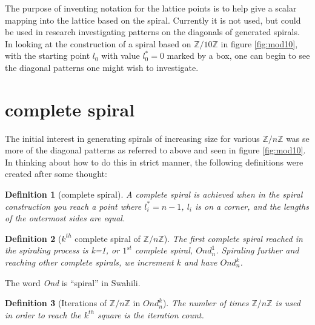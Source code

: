 \documentclass[11pt]{amsart}
\theoremstyle{mydef}
\newtheorem{definition}{Definition}
\begin{document}
The purpose of inventing notation for the lattice points is to help give a scalar mapping into the lattice based on the spiral. Currently it is not used, but could be used in research investigating patterns on the diagonals of generated spirals. In looking at the construction of a spiral based on $\mathbb{Z}/10\mathbb{Z}$ in figure \ref{fig:mod10}, with the starting point $l_0$ with value $l^*_0 = 0$ marked by a box, one can begin to see the diagonal patterns one might wish to investigate.




\section{complete spiral}
The initial interest in generating spirals of increasing size for various $\mathbb{Z}/n\mathbb{Z}$ was se more of the diagonal patterns as referred to above and seen in figure \ref{fig:mod10}. In thinking about how to do this in strict manner, the following definitions were created after some thought:

\begin{definition}[complete spiral]
A complete spiral is achieved when in the spiral construction you reach a point where $l^*_i = n-1$, $l_i$ is on a corner, and the lengths of the outermost sides are equal.
\end{definition}

\begin{definition}[$k^{th}$ complete spiral of $\mathbb{Z}/n\mathbb{Z}$]
The first complete spiral reached in the spiraling process is k=1, or $1^{st}$ complete spiral,  $Ond^1_n$. Spiraling further and reaching other complete spirals, we increment $k$ and have $Ond^k_n$.
\end{definition}

The word \textit{Ond} is ``spiral'' in Swahili.

\begin{definition}[Iterations of  $\mathbb{Z}/n\mathbb{Z}$ in $Ond^k_n$]
The number of times $\mathbb{Z}/n\mathbb{Z}$ is used in order to reach the $k^{th}$ square is the iteration count.
\end{definition}
\end{document}
